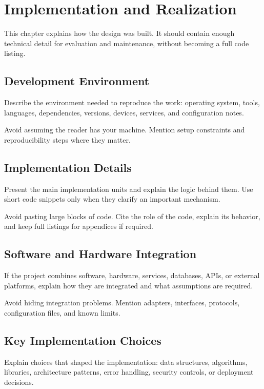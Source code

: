 \chapter{Implementation and Realization}
\label{chap:implementation-realization}

This chapter explains how the design was built. It should contain enough technical detail for evaluation and maintenance, without becoming a full code listing.

\section{Development Environment}
Describe the environment needed to reproduce the work: operating system, tools, languages, dependencies, versions, devices, services, and configuration notes.

Avoid assuming the reader has your machine. Mention setup constraints and reproducibility steps where they matter.

\section{Implementation Details}
Present the main implementation units and explain the logic behind them. Use short code snippets only when they clarify an important mechanism.


Avoid pasting large blocks of code. Cite the role of the code, explain its behavior, and keep full listings for appendices if required.

\section{Software and Hardware Integration}
If the project combines software, hardware, services, databases, APIs, or external platforms, explain how they are integrated and what assumptions are required.

Avoid hiding integration problems. Mention adapters, interfaces, protocols, configuration files, and known limits.

\section{Key Implementation Choices}
Explain choices that shaped the implementation: data structures, algorithms, libraries, architecture patterns, error handling, security controls, or deployment decisions.

